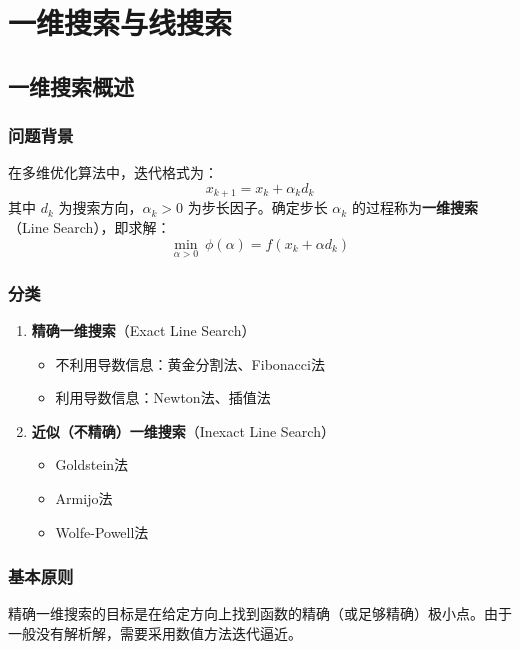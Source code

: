 \chapter{一维搜索与线搜索}\label{chap:linesearch}
\section{一维搜索概述}\label{sec:ch4-intro}

\subsection{问题背景}

在多维优化算法中，迭代格式为：
\[
x_{k+1} = x_k + \alpha_k d_k
\]
其中 $d_k$ 为搜索方向，$\alpha_k > 0$ 为步长因子。确定步长 $\alpha_k$ 的过程称为\textbf{一维搜索}（Line Search），即求解：
\[
\min_{\alpha > 0}\ \phi(\alpha) = f(x_k + \alpha d_k)
\]

\subsection{分类}

\begin{conceptbox}[一维搜索方法分类]
\begin{enumerate}[label=\arabic*., leftmargin=2em]
    \item \textbf{精确一维搜索}（Exact Line Search）
    \begin{itemize}
        \item 不利用导数信息：黄金分割法、Fibonacci法
        \item 利用导数信息：Newton法、插值法
    \end{itemize}
    \item \textbf{近似（不精确）一维搜索}（Inexact Line Search）
    \begin{itemize}
        \item Goldstein法
        \item Armijo法
        \item Wolfe-Powell法
    \end{itemize}
\end{enumerate}
\end{conceptbox}

\subsection{基本原则}

精确一维搜索的目标是在给定方向上找到函数的精确（或足够精确）极小点。由于一般没有解析解，需要采用数值方法迭代逼近。

